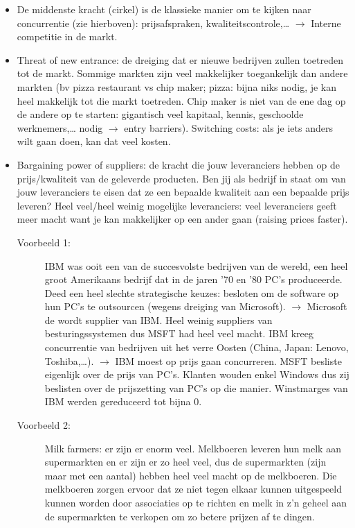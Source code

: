 \documentclass[10pt,a4paper]{report}
\begin{document}
\begin{itemize}
\item De middenste kracht (cirkel) is de klassieke manier om te kijken naar concurrentie (zie hierboven): prijsafspraken, kwaliteitscontrole,… $\rightarrow$ Interne competitie in de markt.
\item Threat of new entrance: de dreiging dat er nieuwe bedrijven zullen toetreden tot de markt. Sommige markten zijn veel makkelijker toegankelijk dan andere markten (bv pizza restaurant vs chip maker; pizza: bijna niks nodig, je kan heel makkelijk tot die markt toetreden. Chip maker is niet van de ene dag op de andere op te starten: gigantisch veel kapitaal, kennis, geschoolde werknemers,… nodig $\rightarrow$ entry barriers). Switching costs: als je iets anders wilt gaan doen, kan dat veel kosten.
\item Bargaining power of suppliers: de kracht die jouw leveranciers hebben op de prijs/kwaliteit van de geleverde producten. Ben jij als bedrijf in staat om van jouw leveranciers te eisen dat ze een bepaalde kwaliteit aan een bepaalde prijs leveren? Heel veel/heel weinig mogelijke leveranciers: veel leveranciers geeft meer macht want je kan makkelijker op een ander gaan (raising prices faster). 
\begin{description}
\item[Voorbeeld 1:] IBM was ooit een van de succesvolste bedrijven van de wereld, een heel groot Amerikaans bedrijf dat in de jaren '70 en '80 PC's produceerde. Deed een heel slechte strategische keuzes: besloten om de software op hun PC's te outsourcen (wegens dreiging van Microsoft). $\rightarrow$ Microsoft de wordt supplier van IBM. Heel weinig suppliers van besturingssystemen dus MSFT had heel veel macht. IBM kreeg concurrentie van bedrijven uit het verre Oosten (China, Japan: Lenovo, Toshiba,…). $\rightarrow$ IBM moest op prijs gaan concurreren. MSFT besliste eigenlijk over de prijs van PC's. Klanten wouden enkel Windows dus zij beslisten over de prijszetting van PC's op die manier. Winstmarges van IBM werden gereduceerd tot bijna 0. 
\item[Voorbeeld 2:] Milk farmers: er zijn er enorm veel. Melkboeren leveren hun melk aan supermarkten en er zijn er zo heel veel, dus de supermarkten (zijn maar met een aantal) hebben heel veel macht op de melkboeren. Die melkboeren zorgen ervoor dat ze niet tegen elkaar kunnen uitgespeeld kunnen worden door associaties op te richten en melk in z'n geheel aan de supermarkten te verkopen om zo betere prijzen af te dingen.
\end{description}

\end{itemize}
\end{document}
